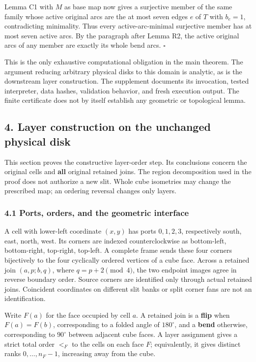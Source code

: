 \documentclass[
  11pt,
]{article}
\begin{document}
Lemma C1 with \(M\) as base map now gives a surjective member of the
same family whose active original arcs are the at most seven edges \(e\)
of \(T\) with \(b_e=1\), contradicting minimality. Thus every
active-arc-minimal surjective member has at most seven active arcs. By
the paragraph after Lemma R2, the active original arcs of any member are
exactly its whole bend arcs. \(\square\)

This is the only exhaustive computational obligation in the main
theorem. The argument reducing arbitrary physical disks to this domain
is analytic, as is the downstream layer construction. The supplement
documents its invocation, tested interpreter, data hashes, validation
behavior, and fresh execution output. The finite certificate does not by
itself establish any geometric or topological lemma.

\subsection{4. Layer construction on the unchanged physical
disk}\label{layer-construction-on-the-unchanged-physical-disk}

This section proves the constructive layer-order step. Its conclusions
concern the original cells and \textbf{all} original retained joins. The
region decomposition used in the proof does not authorize a new slit.
Whole cube isometries may change the prescribed map; an ordering
reversal changes only layers.

\subsubsection{4.1 Ports, orders, and the geometric
interface}\label{ports-orders-and-the-geometric-interface}

A cell with lower-left coordinate \((x,y)\) has ports \(0,1,2,3\),
respectively south, east, north, west. Its corners are indexed
counterclockwise as bottom-left, bottom-right, top-right, top-left. A
complete frame sends these four corners bijectively to the four
cyclically ordered vertices of a cube face. Across a retained join
\((a,p;b,q)\), where \(q=p+2\pmod4\), the two endpoint images agree in
reverse boundary order. Source corners are identified only through
actual retained joins. Coincident coordinates on different slit banks or
split corner fans are not an identification.

Write \(F(a)\) for the face occupied by cell \(a\). A retained join is a
\textbf{flip} when \(F(a)=F(b)\), corresponding to a folded angle of
\(180^\circ\), and a \textbf{bend} otherwise, corresponding to
\(90^\circ\) between adjacent cube faces. A layer assignment gives a
strict total order \(<_F\) to the cells on each face \(F\);
equivalently, it gives distinct ranks \(0,\ldots,n_F-1\), increasing
away from the cube.
\end{document}
